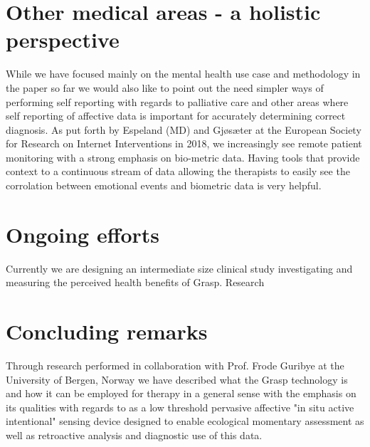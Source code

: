 \section{Other medical areas - a holistic perspective}
While we have focused mainly on the mental health use case and methodology in the paper so far we would also like to point out the need simpler ways of performing self reporting with regards to palliative care and other areas where self reporting of affective data is important for accurately determining correct diagnosis. As put forth by Espeland (MD) and Gjøsæter \cite{gjosater2018esrii} at the European Society for Research on Internet Interventions in 2018, we increasingly see remote patient monitoring with a strong emphasis on bio-metric data. Having tools that provide context to a continuous stream of data allowing the therapists to easily see the corrolation between emotional events and biometric data is very helpful.


\section{Ongoing efforts}
Currently we are designing an intermediate size clinical study investigating and measuring the perceived health benefits of Grasp. Research 

\section{Concluding remarks}
Through research performed in collaboration with Prof. Frode Guribye at the University of Bergen, Norway we have described what the Grasp technology is and how it can be employed for therapy in a general sense with the emphasis on its qualities with regards to as a low threshold pervasive affective "in situ active intentional" \cite[p.~2]{guribye2016}  sensing device designed to enable ecological momentary assessment as well as retroactive analysis and diagnostic use of this data.





\balance{}

